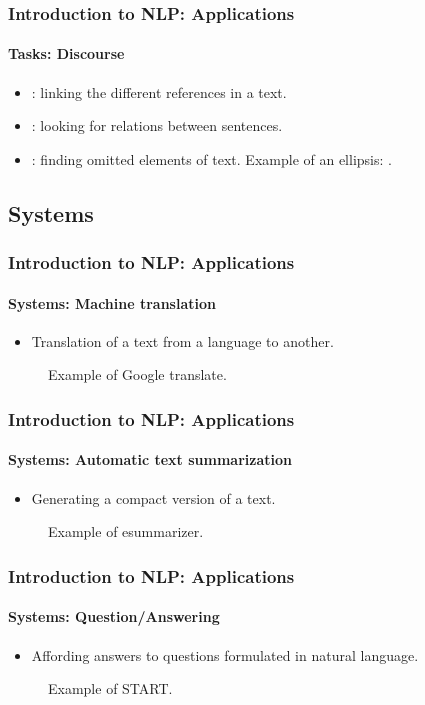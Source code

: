 \documentclass[xcolor=table]{beamer}
\begin{document}
\begin{frame}
\frametitle{Introduction to NLP: Applications}
\framesubtitle{Tasks: Discourse}

\begin{itemize}
	\item {}: linking the different references in a text.
	\item {}: looking for relations between sentences.
	\item {}: finding omitted elements of text.
	Example of an ellipsis: .
\end{itemize}

\end{frame}

\subsection{Systems}

\begin{frame}
\frametitle{Introduction to NLP: Applications}
\framesubtitle{Systems: Machine translation}

\begin{itemize}
	\item Translation of a text from a language to another.
\end{itemize}

\begin{figure}
	\caption{Example of Google translate.}
\end{figure}

\end{frame}

\begin{frame}
\frametitle{Introduction to NLP: Applications}
\framesubtitle{Systems: Automatic text summarization}

\begin{itemize}
	\item Generating a compact version of a text.
\end{itemize}

\begin{figure}
	\caption{Example of esummarizer.}
\end{figure}

\end{frame}

\begin{frame}
\frametitle{Introduction to NLP: Applications}
\framesubtitle{Systems: Question/Answering}

\begin{itemize}
	\item Affording answers to questions formulated in natural language.
\end{itemize}

\begin{figure}
	\caption{Example of START.}
\end{figure}

\end{frame}
\end{document}
